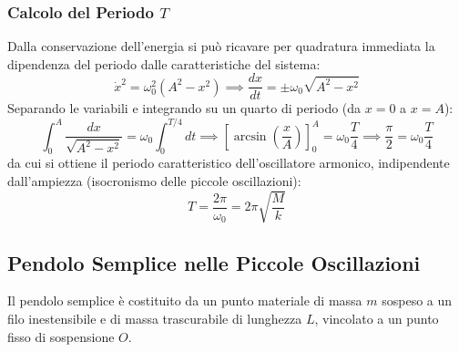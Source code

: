 \subsubsection*{Calcolo del Periodo $T$}
Dalla conservazione dell'energia si può ricavare per quadratura immediata la dipendenza del periodo dalle caratteristiche del sistema:
\begin{equation}
    \dot{x}^2 = \omega_0^2(A^2 - x^2) \implies \frac{dx}{dt} = \pm \omega_0\sqrt{A^2 - x^2}
\end{equation}
Separando le variabili e integrando su un quarto di periodo (da $x = 0$ a $x = A$):
\begin{equation}
    \int_0^A \frac{dx}{\sqrt{A^2 - x^2}} = \omega_0 \int_0^{T/4} dt \implies \left[ \arcsin\left(\frac{x}{A}\right) \right]_0^A = \omega_0 \frac{T}{4} \implies \frac{\pi}{2} = \omega_0 \frac{T}{4}
\end{equation}
da cui si ottiene il periodo caratteristico dell'oscillatore armonico, indipendente dall'ampiezza (isocronismo delle piccole oscillazioni):
\begin{equation}
    T = \frac{2\pi}{\omega_0} = 2\pi\sqrt{\frac{M}{k}}
\end{equation}

\subsection{Pendolo Semplice nelle Piccole Oscillazioni}
Il pendolo semplice è costituito da un punto materiale di massa $m$ sospeso a un filo inestensibile e di massa trascurabile di lunghezza $L$, vincolato a un punto fisso di sospensione $O$.


